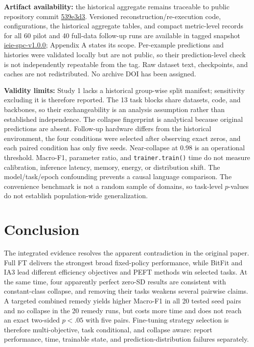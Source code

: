 \documentclass{SPC}
\begin{document}
\textbf{Artifact availability:} the historical aggregate remains traceable to public repository commit \href{https://github.com/LEESY-X/Domain_fine-tuning_experiments/tree/539e3d3}{\underline{539e3d3}}. Versioned reconstruction/re-execution code, configurations, the historical aggregate tables, and compact metric-level records for all 60 pilot and 40 full-data follow-up runs are available in tagged snapshot \href{https://github.com/LEESY-X/Domain_fine-tuning_experiments/tree/ieie-spc-v1.0.0}{\underline{ieie-spc-v1.0.0}}; Appendix A states its scope. Per-example predictions and histories were validated locally but are not public, so their prediction-level check is not independently repeatable from the tag. Raw dataset text, checkpoints, and caches are not redistributed. No archive DOI has been assigned.

\textbf{Validity limits:} Study 1 lacks a historical group-wise split manifest; sensitivity excluding it is therefore reported. The 13 task blocks share datasets, code, and backbones, so their exchangeability is an analysis assumption rather than established independence. The collapse fingerprint is analytical because original predictions are absent. Follow-up hardware differs from the historical environment, the four conditions were selected after observing exact zeros, and each paired condition has only five seeds. Near-collapse at 0.98 is an operational threshold. Macro-F1, parameter ratio, and \texttt{trainer.train()} time do not measure calibration, inference latency, memory, energy, or distribution shift. The model/task/epoch confounding prevents a causal language comparison. The convenience benchmark is not a random sample of domains, so task-level $p$-values do not establish population-wide generalization.


\section{Conclusion}

The integrated evidence resolves the apparent contradiction in the original paper. Full FT delivers the strongest broad fixed-policy performance, while BitFit and IA3 lead different efficiency objectives and PEFT methods win selected tasks. At the same time, four apparently perfect zero-SD results are consistent with constant-class collapse, and removing their tasks weakens several pairwise claims. A targeted combined remedy yields higher Macro-F1 in all 20 tested seed pairs and no collapse in the 20 remedy runs, but costs more time and does not reach an exact two-sided $p<.05$ with five pairs. Fine-tuning strategy selection is therefore multi-objective, task conditional, and collapse aware: report performance, time, trainable state, and prediction-distribution failures separately.
\end{document}
